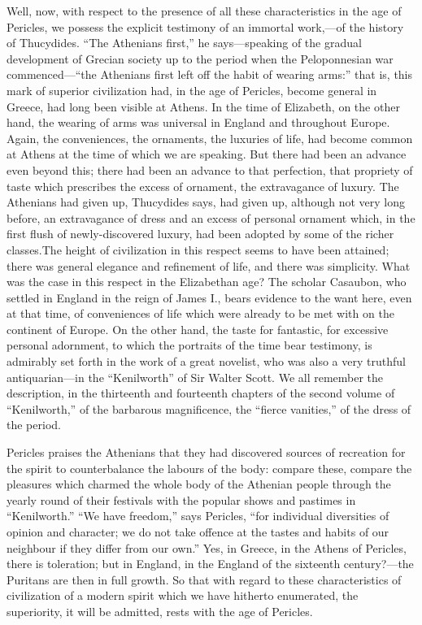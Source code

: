Well, now, with respect to the presence of all these characteristics in
the age of Pericles, we possess the explicit testimony of an immortal
work,---of the history of Thucydides. ``The Athenians first,'' he
says---speaking of the gradual development of Grecian society up to the
period when the Peloponnesian war commenced---``the Athenians first left
off the habit of wearing arms:'' that is, this mark of superior
civilization had, in the age of Pericles, become general in Greece, had
long been visible at Athens. In the time of Elizabeth, on the other
hand, the wearing of arms was universal in England and throughout
Europe. Again, the conveniences, the ornaments, the luxuries of life,
had become common at Athens at the time of which we are speaking. But
there had been an advance even beyond this; there had been an advance to
that perfection, that propriety of taste which prescribes the excess of
ornament, the extravagance of luxury. The Athenians had given up,
Thucydides says, had given up, although not very long before, an
extravagance of dress and an excess of personal ornament which, in the
first flush of newly-discovered luxury, had been adopted by some of the
richer classes.The height of civilization in this respect seems to have
been attained; there was general elegance and refinement of life, and
there was simplicity. What was the case in this respect in the
Elizabethan age? The scholar Casaubon, who settled in England in the
reign of James I., bears evidence to the want here, even at that time,
of conveniences of life which were already to be met with on the
continent of Europe. On the other hand, the taste for fantastic, for
excessive personal adornment, to which the portraits of the time bear
testimony, is admirably set forth in the work of a great novelist, who
was also a very truthful antiquarian---in the ``Kenilworth'' of Sir
Walter Scott. We all remember the description, in the thirteenth and
fourteenth chapters of the second volume of ``Kenilworth,'' of the
barbarous magnificence, the ``fierce vanities,'' of the dress of the
period.

Pericles praises the Athenians that they had discovered sources of
recreation for the spirit to counterbalance the labours of the body:
compare these, compare the pleasures which charmed the whole body of the
Athenian people through the yearly round of their festivals with the
popular shows and pastimes in ``Kenilworth.'' ``We have freedom,'' says
Pericles, ``for individual diversities of opinion and character; we do
not take offence at the tastes and habits of our neighbour if they
differ from our own.'' Yes, in Greece, in the Athens of Pericles, there
is toleration; but in England, in the England of the sixteenth
century?---the Puritans are then in full growth. So that with regard to
these characteristics of civilization of a modern spirit which we have
hitherto enumerated, the superiority, it will be admitted, rests with
the age of Pericles.


